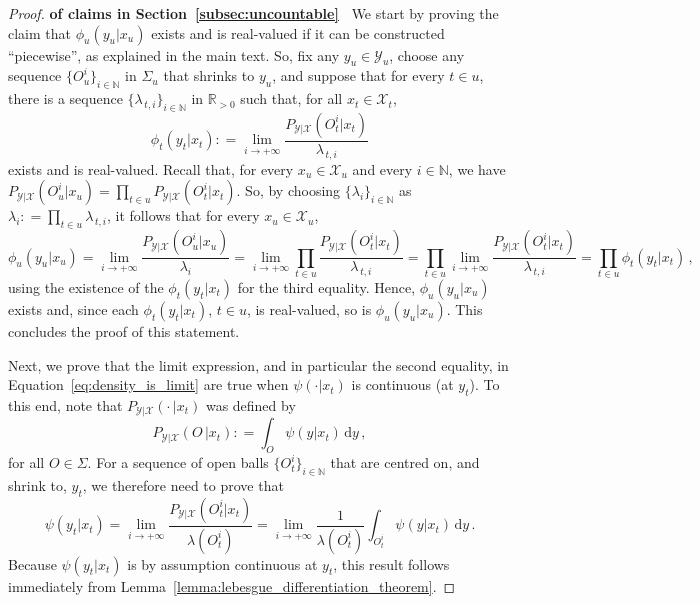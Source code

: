 \documentclass[twoside,11pt]{article}
\newcommand{\nats}{\mathbb{N}}
\newcommand{\reals}{\mathbb{R}}
\newcommand{\realspos}{\reals_{>0}}
\newcommand{\states}{\mathcal{X}}
\newcommand{\observs}{\mathcal{Y}}
\newcommand{\coloneqq}{:\!=}
\begin{document}
\begin{proof}{\bf of claims in Section~\ref{subsec:uncountable}~}
We start by proving the claim that $\phi_u(y_u\vert x_u)$ exists and is real-valued if it can be constructed ``piecewise'', as explained in the main text. So, fix any $y_u\in\observs_u$, choose any sequence $\{O_u^i\}_{i\in\nats}$ in $\Sigma_u$  that shrinks to $y_u$, and suppose that for every $t\in u$, there is a sequence $\{\lambda_{\,t,i}\}_{i\in\nats}$ in $\realspos$ such that, for all $x_t\in\states_t$,
\begin{equation*}
\phi_t(y_t\vert x_t) \coloneqq \lim_{i\to+\infty} \frac{P_{\observs\vert\states}(O_t^i\vert x_t)}{\lambda_{\,t,i}}
\end{equation*}
exists and is real-valued. Recall that, for every $x_u\in\states_u$ and every $i\in\nats$, we have $P_{\observs\vert\states}(O_u^i\vert x_u)=\prod_{t\in u}P_{\observs\vert\states}(O_t^i\vert x_t)$. So, by choosing $\{\lambda_i\}_{i\in\nats}$ as $\lambda_i\coloneqq \prod_{t\in u}\lambda_{\,t,i}$, it follows that for every $x_u\in\states_u$,
\begin{equation*}
\phi_u(y_u\vert x_u) = \lim_{i\to+\infty} \frac{P_{\observs\vert\states}(O_u^i\vert x_u)}{\lambda_i} = \lim_{i\to+\infty} \prod_{t\in u}\frac{P_{\observs\vert\states}(O_t^i\vert x_t)}{\lambda_{\,t,i}} = \prod_{t\in u}\lim_{i\to+\infty} \frac{P_{\observs\vert\states}(O_t^i\vert x_t)}{\lambda_{\,t,i}} = \prod_{t\in u} \phi_t(y_t\vert x_t)\,,
\end{equation*}
using the existence of the $\phi_t(y_t\vert x_t)$ for the third equality. Hence, $\phi_u(y_u\vert x_u)$ exists and, since each $\phi_t(y_t\vert x_t)$, $t\in u$, is real-valued, so is $\phi_u(y_u\vert x_u)$. This concludes the proof of this statement.

Next, we prove that the limit expression, and in particular the second equality, in Equation~\eqref{eq:density_is_limit} are true when $\psi(\cdot\vert x_t)$ is continuous (at $y_t$). To this end, note that $P_{\observs\vert\states}(\cdot\,\vert x_t)$ was defined by
\begin{equation*}
P_{\observs\vert\states}(O\,\vert x_t) \coloneqq \int_O \psi(y\vert x_t)\,\mathrm{d}y\,,
\end{equation*}
for all $O\in\Sigma$. For a sequence of open balls $\{O_t^i\}_{i\in\nats}$ that are centred on, and shrink to, $y_t$, we therefore need to prove that
\begin{equation*}
\psi(y_t\vert x_t) = \lim_{i\to+\infty}\frac{P_{\observs\vert\states}(O_t^i\vert x_t)}{\lambda(O_t^i)} = \lim_{i\to+\infty}\frac{1}{\lambda(O_t^i)}\int_{O_t^i}\psi(y\vert x_t)\,\mathrm{d} y\,.
\end{equation*}
Because $\psi(y_t\vert x_t)$ is by assumption continuous at $y_t$, this result follows immediately from Lemma~\ref{lemma:lebesgue_differentiation_theorem}.


\end{proof}
\end{document}
